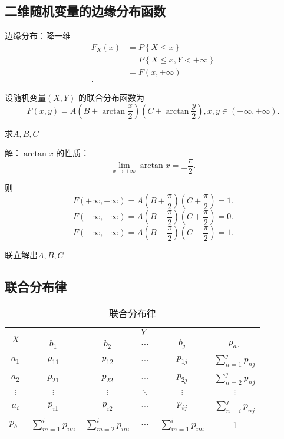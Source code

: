 \subsection{二维随机变量的边缘分布函数}%
\label{sub:二维随机变量的边缘分布函数}
边缘分布：降一维
\begin{align*}
    F_{X}\left( x \right) &= P\left\{ X\le x \right\}  \\
    &= P\left\{ X\le x,Y<+\infty \right\}  \\
    &= F\left( x,+\infty \right)  \\
.\end{align*}
\begin{eg}
    设随机变量$\left( X,Y \right) $ 的联合分布函数为\[
        F\left( x,y \right) =A\left( B+\arctan \frac{x}{2} \right) \left( C+\arctan \frac{y}{2} \right) , x,y\in \left( -\infty,+\infty \right) 
    .\] 

    求$A,B,C$ 

    解：$\arctan x$ 的性质：\[
        \lim_{x \to \pm\infty} \arctan x=\pm\frac{\pi}{2}
    .\] 

    则\[
        F\left( +\infty,+\infty \right) =A\left( B+\frac{\pi}{2} \right) \left( C+\frac{\pi}{2} \right)=1 
    .\] 
    \[
        F\left( -\infty,+\infty \right) =A\left( B-\frac{\pi}{2} \right) \left( C+\frac{\pi}{2} \right) =0
    .\] 
    \[
        F\left( -\infty,-\infty \right) =A\left( B-\frac{\pi}{2} \right) \left( C-\frac{\pi}{2} \right) =1
    .\] 

    联立解出$A,B,C$
\end{eg}
\subsection{联合分布律}%
\label{sub:联合分布律}
\begin{table}[htpb]
    \centering
    \caption{联合分布律}
    \label{tab:联合分布律}
    \begin{tabular}{ccccc|c}
    \toprule
    \multirow{2}{*}{$X$} & \multicolumn{5}{c}{$Y$} \\
    \cmidrule{2-6}
                         & $b_1$ & $b_2$ & $\ldots$ & $b_{j}$ & $p_{a\cdot }$ \\
                         \hline
    $a_1$ & $p_{11}$ & $p_{12}$ & $\ldots$ & $p_{1j}$ & $\displaystyle{\sum_{n=1}^{j} p_{nj}}$\\
    $a_2$ & $p_{21}$ & $p_{22}$ & $\ldots$ & $p_{2j}$ & $\displaystyle{\sum_{n=2}^{j} p_{nj}}$ \\
    $\vdots$ & $\vdots$ & $\vdots$ & $\ddots$ & $\vdots$ & $\vdots$\\
    $a_{i}$ & $p_{i1}$ & $p_{i2}$ & $\ldots$ & $p_{ij}$ & $\displaystyle{\sum_{n=i}^{j} p_{nj}}$\\
    \hline
    $p_{b\cdot }$ & $\displaystyle{\sum_{m=1}^{i} p_{im}}$ & $\displaystyle{\sum_{m=2}^{i} p_{im}}$ & $\ldots$ & $\displaystyle{\sum_{m=1}^{i} p_{im}}$ & 1\\
    \bottomrule
    \end{tabular}
\end{table}

